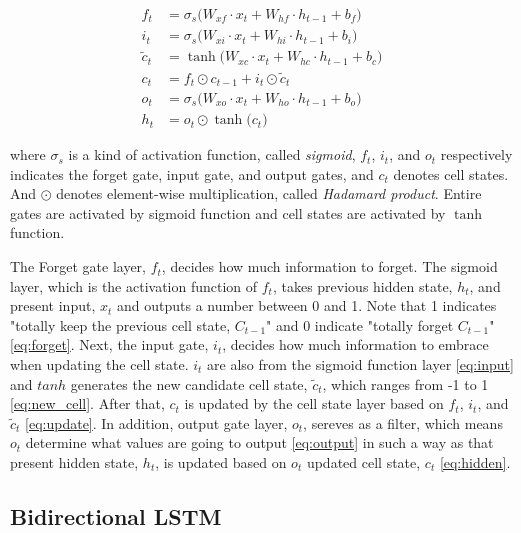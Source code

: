 \documentclass{ieeeaccess}
\begin{document}
\begin{align}
f_{t} & =\sigma _{s}\big(W_{xf}\cdot x_{t}+W_{hf}\cdot h_{t-1}+b_{f}\big)\label{eq:forget}\\
i_{t} & =\sigma _{s}\big(W_{xi}\cdot x_{t}+W_{hi}\cdot h_{t-1}+b_{i}\big)\label{eq:input}\\
\tilde{c}_{t} & = \tanh\big(W_{xc}\cdot x_{t}+W_{hc}\cdot h_{t-1}+b_{c}\big)\label{eq:new_cell}\\
c_{t} & =f_{t}\odot c_{t-1}+i_{t}\odot\tilde{c}_{t}\label{eq:update}\\
o_{t} & =\sigma _{s}\big(W_{xo}\cdot x_{t}+W_{ho}\cdot h_{t-1}+b_{o}\big)\label{eq:output}\\
h_{t} & =o_{t}\odot \tanh\big(c_{t}\big)\label{eq:hidden}
\end{align}

where $\sigma _{s}$ is a kind of activation function, called \textit{sigmoid},  $f_{t}$, $i_{t}$, and $o_{t}$ respectively indicates the forget gate, input gate, and output gates, and $c_{t}$ denotes cell states. And $\odot$ denotes element-wise multiplication, called \textit{Hadamard product}. Entire gates are activated by sigmoid function and cell states are activated by $\tanh$ function.

The Forget gate layer, $f_{t}$, decides how much information to forget. The sigmoid layer, which is the activation function of $f_{t}$, takes previous hidden state, $h_{t}$, and present input, $x_{t}$ and outputs a number between 0 and 1. Note that 1 indicates "totally keep the previous cell state, $C_{t-1}$" and 0 indicate "totally forget $C_{t-1}$" \eqref{eq:forget}. Next, the input gate, $i_{t}$, decides how much information to embrace when updating the cell state. $i_{t}$ are also from the sigmoid function layer \eqref{eq:input} and $tanh$ generates the new candidate cell state, $\tilde{c}_{t}$, which ranges from -1 to 1 \eqref{eq:new_cell}. After that, $c_{t}$ is updated by the cell state layer based on $f_{t}$, $i_{t}$, and $\tilde{c}_{t}$ \eqref{eq:update}. In addition, output gate layer, $o_{t}$, sereves as a filter, which means $o_{t}$ determine what values are going to output \eqref{eq:output} in such a way as that present hidden state, $h_{t}$, is updated based on $o_{t}$ updated cell state, $c_{t}$ \eqref{eq:hidden}. 


\subsection{Bidirectional LSTM}
\end{document}
